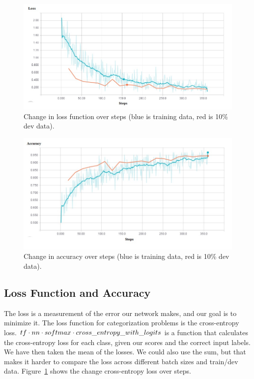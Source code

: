 \begin{figure}[tb]
\centering
\includegraphics [width=\linewidth]{LossOverSteps.jpg}
\caption[]{Change in loss function over steps (blue is training data, red is 10\% dev data).}
\label{fig:loss}
\end{figure}

\begin{figure}[tb]
\centering
\includegraphics [width=\linewidth]{Accuracyoversteps.jpg}
\caption[]{Change in accuracy over steps (blue is training data, red is 10\% dev data).}
\label{fig:accuracy}
\end{figure}

\subsection{Loss Function and Accuracy}


The loss is a measurement of the error our network makes, and our goal is to minimize it. The loss function for categorization problems is the cross-entropy loss.
$tf\cdot{nn}\cdot{softmax}\cdot{cross}\char`_entropy\char`_with\char`_logits$ is a function that calculates the cross-entropy loss for each class, given our scores and the correct input labels. We have then taken the mean of the losses. We could also use the sum, but that makes it harder to compare the loss across different batch sizes and train/dev data. Figure~\ref{fig:loss} shows the change cross-entropy loss over steps.

